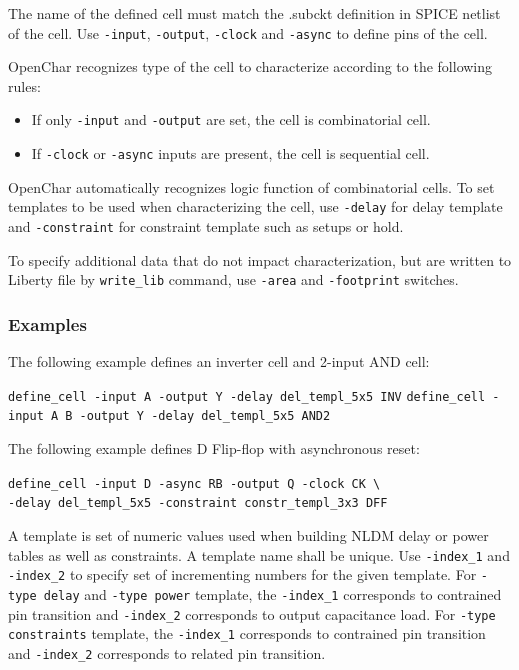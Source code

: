 \documentclass[12pt, a4paper]{article}
\begin{document}
The name of the defined cell must match the .subckt definition in SPICE netlist
of the cell. Use \texttt{-input}, \texttt{-output}, \texttt{-clock} and
\texttt{-async} to define pins of the cell.

OpenChar recognizes type of the cell to characterize according to the following rules:
\begin{itemize}
    \item {If only \texttt{-input} and \texttt{-output} are set, the cell is combinatorial cell.}
    \item {If \texttt{-clock} or \texttt{-async} inputs are present, the cell is sequential cell.}
\end{itemize}

OpenChar automatically recognizes logic function of combinatorial cells.
To set templates to be used when characterizing the cell, use \texttt{-delay}
for delay template and \texttt{-constraint} for constraint template such as
setups or hold.

To specify additional data that do not impact characterization, but are
written to Liberty file by \texttt{write_lib} command, use \texttt{-area}
and \texttt{-footprint} switches.

\subsubsection*{Examples}

The following example defines an inverter cell and 2-input AND cell:

\texttt{define_cell -input A -output Y -delay del_templ_5x5 INV} \newline
\texttt{define_cell -input {A B} -output Y -delay del_templ_5x5 AND2}

The following example defines D Flip-flop with asynchronous reset:

\texttt{define_cell -input D -async RB -output Q -clock CK \textbackslash\\}
\hspace*{2.6cm}\texttt{-delay del_templ_5x5 -constraint constr_templ_3x3 DFF}




A template is set of numeric values used when building NLDM delay or power tables
as well as constraints. A template name shall be unique.
Use \texttt{-index_1} and \texttt{-index_2} to specify set of incrementing numbers
for the given template.
For \texttt{-type delay} and \texttt{-type power} template, the \texttt{-index_1}
corresponds to contrained pin transition and \texttt{-index_2} corresponds to output
capacitance load.
For \texttt{-type constraints} template, the \texttt{-index_1} corresponds to contrained
pin transition and \texttt{-index_2} corresponds to related pin transition.
\end{document}

